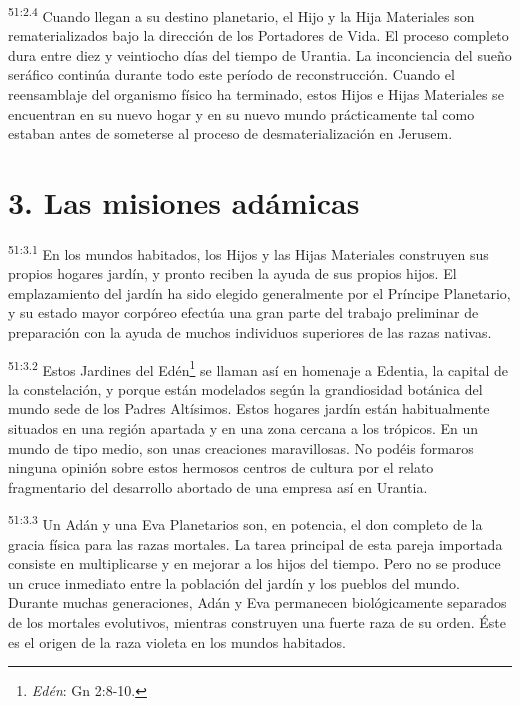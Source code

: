 \par
\textsuperscript{51:2.4} Cuando llegan a su destino planetario, el Hijo y la Hija Materiales son rematerializados bajo la dirección de los Portadores de Vida. El proceso completo dura entre diez y veintiocho días del tiempo de Urantia. La inconciencia del sueño seráfico continúa durante todo este período de reconstrucción. Cuando el reensamblaje del organismo físico ha terminado, estos Hijos e Hijas Materiales se encuentran en su nuevo hogar y en su nuevo mundo prácticamente tal como estaban antes de someterse al proceso de desmaterialización en Jerusem.

\section*{3. Las misiones adámicas}
\par
\textsuperscript{51:3.1} En los mundos habitados, los Hijos y las Hijas Materiales construyen sus propios hogares jardín, y pronto reciben la ayuda de sus propios hijos. El emplazamiento del jardín ha sido elegido generalmente por el Príncipe Planetario, y su estado mayor corpóreo efectúa una gran parte del trabajo preliminar de preparación con la ayuda de muchos individuos superiores de las razas nativas.

\par
\textsuperscript{51:3.2} Estos Jardines del Edén\footnote{\textit{Edén}: Gn 2:8-10.} se llaman así en homenaje a Edentia, la capital de la constelación, y porque están modelados según la grandiosidad botánica del mundo sede de los Padres Altísimos. Estos hogares jardín están habitualmente situados en una región apartada y en una zona cercana a los trópicos. En un mundo de tipo medio, son unas creaciones maravillosas. No podéis formaros ninguna opinión sobre estos hermosos centros de cultura por el relato fragmentario del desarrollo abortado de una empresa así en Urantia.

\par
\textsuperscript{51:3.3} Un Adán y una Eva Planetarios son, en potencia, el don completo de la gracia física para las razas mortales. La tarea principal de esta pareja importada consiste en multiplicarse y en mejorar a los hijos del tiempo. Pero no se produce un cruce inmediato entre la población del jardín y los pueblos del mundo. Durante muchas generaciones, Adán y Eva permanecen biológicamente separados de los mortales evolutivos, mientras construyen una fuerte raza de su orden. Éste es el origen de la raza violeta en los mundos habitados.

